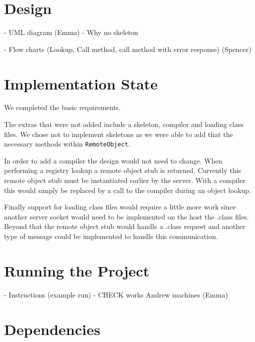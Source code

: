 \documentclass[12pt]{article}
\begin{document}
\maketitle


\section{Design}

- UML diagram (Emma)
- Why no skeleton

- Flow charts (Lookup, Call method, call method with error response) (Spencer)


\section{Implementation State}

We completed the basic requirements.

The extras that were not added include a skeleton, compiler and loading class files. We chose not to implement skeletons as we were able to add that the necessary methods within \texttt{RemoteObject}.

In order to add a compiler the design would not need to change. When performing a registry lookup a remote object stub is returned. Currently this remote object stub must be instantiated earlier by the server. With a compiler this would simply be replaced by a call to the compiler during an object lookup.

Finally support for loading class files would require a little more work since another server socket would need to be implemented on the host the .class files. Beyond that the remote object stub would handle a .class request and another type of message could be implemented to handle this communication.


\section{Running the Project}

- Instructions (example run)
- CHECK works Andrew machines
(Emma)


\section{Dependencies}
\end{document}
